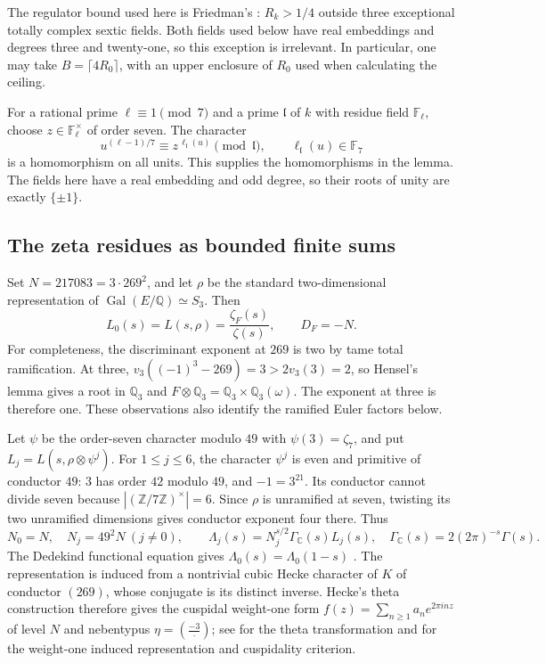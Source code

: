 The regulator bound used here is Friedman's
\cite[Theorem~B, pp.~599--600]{sevenFriedman1989}: $R_k>1/4$ outside three
exceptional totally complex sextic fields. Both fields used below have real
embeddings and degrees three and twenty-one, so this exception is irrelevant.
In particular, one may take $B=\lceil4R_0\rceil$, with an upper enclosure of
$R_0$ used when calculating the ceiling.

For a rational prime $\ell\equiv1\pmod7$ and a prime
$\mathfrak l$ of $k$ with residue field $\mathbb F_\ell$, choose
$z\in\mathbb F_\ell^\times$ of order seven. The character
\[
 u^{(\ell-1)/7}\equiv z^{\,\ell_{\mathfrak l}(u)}
 \pmod{\mathfrak l},\qquad
 \ell_{\mathfrak l}(u)\in\mathbb F_7
 \tag{S6}\label{seven:residue-character}
\]
is a homomorphism on all units. This supplies the homomorphisms in the lemma.
The fields here have a real embedding and odd degree, so their roots of
unity are exactly $\{\pm1\}$.

\subsection{The zeta residues as bounded finite sums}
\label{seven:analytic}

Set $N=217083=3\cdot269^2$, and let $\rho$ be the standard two-dimensional
representation of $\operatorname{Gal}(E/\mathbb Q)\simeq S_3$. Then
\[
 L_0(s)=L(s,\rho)=\frac{\zeta_F(s)}{\zeta(s)},\qquad
 D_F=-N.
 \tag{S7}\label{seven:base-L}
\]
For completeness, the discriminant exponent at $269$ is two by tame total
ramification. At three, $v_3((-1)^3-269)=3>2v_3(3)=2$, so Hensel's
lemma gives a root in $\mathbb Q_3$ and
$F\otimes\mathbb Q_3=\mathbb Q_3\times\mathbb Q_3(\omega)$.
The exponent at three is therefore one. These observations also identify
the ramified Euler factors below.

Let $\psi$ be the order-seven character modulo $49$ with
$\psi(3)=\zeta_7$, and put $L_j=L(s,\rho\otimes\psi^j)$.
For $1\le j\le6$, the character $\psi^j$ is even and primitive of conductor
$49$: $3$ has order $42$ modulo $49$, and $-1=3^{21}$.
Its conductor cannot divide seven because
$|(\mathbb Z/7\mathbb Z)^\times|=6$.
Since $\rho$ is unramified at seven, twisting its two unramified dimensions
gives conductor exponent four there. Thus
\[
 N_0=N,\quad N_j=49^2N\ (j\ne0),\qquad
 \Lambda_j(s)=N_j^{s/2}\Gamma_{\mathbb C}(s)L_j(s),
 \quad
 \Gamma_{\mathbb C}(s)=2(2\pi)^{-s}\Gamma(s).
 \tag{S8}\label{seven:conductors}
\]
The Dedekind functional equation gives
$\Lambda_0(s)=\Lambda_0(1-s)$
\cite[Remark~18.14]{sevenSutherland2015}.
The representation is induced from a nontrivial cubic Hecke character of
$K$ of conductor $(269)$, whose conjugate is its distinct inverse.
Hecke's theta construction therefore gives the cuspidal weight-one form
$f(z)=\sum_{n\ge1}a_ne^{2\pi inz}$ of level $N$ and nebentypus
$\eta=\left(\frac{-3}{\,\cdot\,}\right)$; see
\cite[Theorem~5]{sevenSimard2015} for the theta transformation and
\cite[\S3]{sevenDarmonLauderRotger2015} for the weight-one induced
representation and cuspidality criterion.

